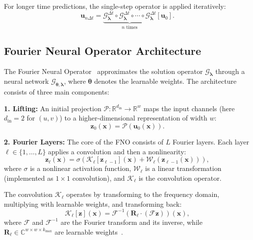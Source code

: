 \documentclass[runningheads]{llncs}
\begin{document}
\noindent For longer time predictions, the single-step operator is applied iteratively:
\begin{equation}
    \bm{u}_{n\Delta t} = \underbrace{\mathcal{G}_{\bm{\lambda}}^{\Delta t} \circ \mathcal{G}_{\bm{\lambda}}^{\Delta t} \circ \cdots \circ \mathcal{G}_{\bm{\lambda}}^{\Delta t}}_{n \text{ times}}[\bm{u}_0].
    \label{eq:autoregressive}
\end{equation}

\subsection{Fourier Neural Operator Architecture}
\label{sec:fno_architecture}

The Fourier Neural Operator~\cite{li2021fourierneuraloperatorparametric} approximates the solution operator $\mathcal{G}_{\bm{\lambda}}$ through a neural network $\mathcal{G}_{\bm{\theta}, \bm{\lambda}}$, where $\bm{\theta}$ denotes the learnable weights. The architecture consists of three main components:

\textbf{1. Lifting:} An initial projection $\mathcal{P}: \mathbb{R}^{d_{\text{in}}} \rightarrow \mathbb{R}^w$ maps the input channels (here $d_{\text{in}} = 2$ for $(u,v)$) to a higher-dimensional representation of width $w$:
\begin{equation}
    \bm{z}_0(\bm{x}) = \mathcal{P}(\bm{u}_0(\bm{x})).
\end{equation}

\textbf{2. Fourier Layers:} The core of the FNO consists of $L$ Fourier layers. Each layer $\ell \in \{1, \ldots, L\}$ applies a convolution and then a nonlinearity:
\begin{equation}
    \bm{z}_{\ell}(\bm{x}) = \sigma\left(\mathcal{K}_{\ell}[\bm{z}_{\ell-1}](\bm{x}) + \mathcal{W}_{\ell}(\bm{z}_{\ell-1}(\bm{x}))\right),
    \label{eq:fourier_layer}
\end{equation}
where $\sigma$ is a nonlinear activation function, $\mathcal{W}_{\ell}$ is a linear transformation (implemented as $1\times1$ convolution), and $\mathcal{K}_{\ell}$ is the convolution operator. 

The convolution $\mathcal{K}_{\ell}$ operates by transforming to the frequency domain, multiplying with learnable weights, and transforming back:
\begin{equation}
    \mathcal{K}_{\ell}[\bm{z}](\bm{x}) = \mathcal{F}^{-1}\left(\bm{R}_{\ell} \cdot (\mathcal{F}\bm{z})\right)(\bm{x}),
    \label{eq:spectral_conv}
\end{equation}
where $\mathcal{F}$ and $\mathcal{F}^{-1}$ are the Fourier transform and its inverse, while $\bm{R}_{\ell} \in \mathbb{C}^{w \times w \times k_{\max}}$ are learnable weights~\cite{li2021fourierneuraloperatorparametric}.
\end{document}
